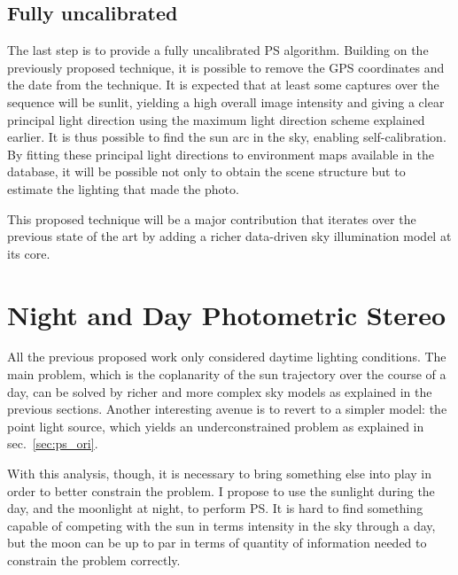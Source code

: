 \subsection{Fully uncalibrated}
\label{subsec:fullyuncalibrated}
The last step is to provide a fully uncalibrated PS algorithm. Building on the previously proposed technique, it is possible to remove the GPS coordinates and the date from the technique. It is expected that at least some captures over the sequence will be sunlit, yielding a high overall image intensity and giving a clear principal light direction using the maximum light direction scheme explained earlier. It is thus possible to find the sun arc in the sky, enabling self-calibration. By fitting these principal light directions to environment maps available in the database, it will be possible not only to obtain the scene structure but to estimate the lighting that made the photo.

This proposed technique will be a major contribution that iterates over the previous state of the art by adding a richer data-driven sky illumination model at its core.


\section{Night and Day Photometric Stereo}
\label{sec:nightandday}

All the previous proposed work only considered daytime lighting conditions. The main problem, which is the coplanarity of the sun trajectory over the course of a day, can be solved by richer and more complex sky models as explained in the previous sections. Another interesting avenue is to revert to a simpler model: the point light source, which yields an underconstrained problem as explained in sec.~\ref{sec:ps_ori}.

With this analysis, though, it is necessary to bring something else into play in order to better constrain the problem. I propose to use the sunlight during the day, and the moonlight at night, to perform PS. It is hard to find something capable of competing with the sun in terms intensity in the sky through a day, but the moon can be up to par in terms of quantity of information needed to constrain the problem correctly.



